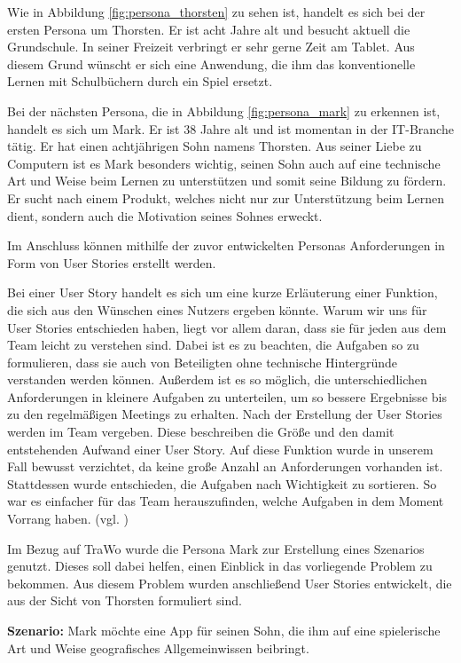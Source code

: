 Wie in Abbildung \ref{fig:persona_thorsten} zu sehen ist, handelt es sich bei der ersten Persona um Thorsten. Er ist acht Jahre alt und besucht aktuell die Grundschule. In seiner Freizeit verbringt er sehr gerne Zeit am Tablet. Aus diesem Grund wünscht er sich eine Anwendung, die ihm das konventionelle Lernen mit Schulbüchern durch ein Spiel ersetzt.

Bei der nächsten Persona, die in Abbildung \ref{fig:persona_mark} zu erkennen ist, handelt es sich um Mark. Er ist 38 Jahre alt und ist momentan in der IT-Branche tätig. Er hat einen achtjährigen Sohn namens Thorsten. Aus seiner Liebe zu Computern ist es Mark besonders wichtig, seinen Sohn auch auf eine technische Art und Weise beim Lernen zu unterstützen und somit seine Bildung zu fördern. Er sucht nach einem Produkt, welches nicht nur zur Unterstützung beim Lernen dient, sondern auch die Motivation seines Sohnes erweckt.

Im Anschluss können mithilfe der zuvor entwickelten Personas Anforderungen in Form von User Stories erstellt werden.

Bei einer User Story handelt es sich um eine kurze Erläuterung einer Funktion, die sich aus den Wünschen eines Nutzers ergeben könnte. Warum wir uns für User Stories entschieden haben, liegt vor allem daran, dass sie für jeden aus dem Team leicht zu verstehen sind. Dabei ist es zu beachten, die Aufgaben so zu formulieren, dass sie auch von Beteiligten ohne technische Hintergründe verstanden werden können. Außerdem ist es so möglich, die unterschiedlichen Anforderungen in kleinere Aufgaben zu unterteilen, um so bessere Ergebnisse bis zu den regelmäßigen Meetings zu erhalten. Nach der Erstellung der User Stories werden im Team  vergeben. Diese beschreiben die Größe und den damit entstehenden Aufwand einer User Story. Auf diese Funktion wurde in unserem Fall bewusst verzichtet, da keine große Anzahl an Anforderungen vorhanden ist. Stattdessen wurde entschieden, die Aufgaben nach Wichtigkeit zu sortieren. So war es einfacher für das Team herauszufinden, welche Aufgaben in dem Moment Vorrang haben. (vgl. \cite{UserStories})

Im Bezug auf TraWo wurde die Persona Mark zur Erstellung eines Szenarios genutzt. Dieses soll dabei helfen, einen Einblick in das vorliegende Problem zu bekommen. Aus diesem Problem wurden anschließend User Stories entwickelt, die aus der Sicht von Thorsten formuliert sind.

\textbf{Szenario:}
Mark möchte eine App für seinen Sohn, die ihm auf eine spielerische Art und Weise geografisches Allgemeinwissen beibringt.

